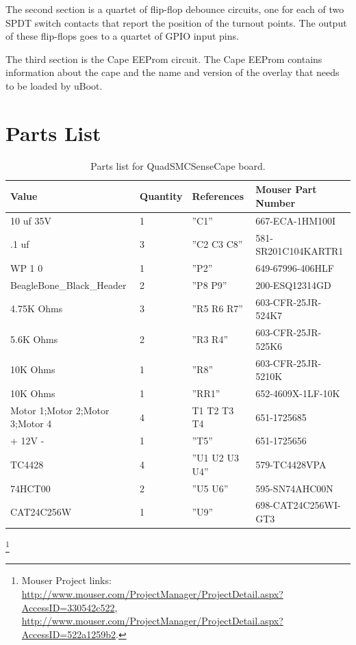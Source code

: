 The second section is a quartet of flip-flop debounce circuits, one for each
of two SPDT switch contacts that report the position of the turnout points.
The output of these flip-flops goes to a quartet of GPIO input pins.

The third section is the Cape EEProm circuit.  The Cape EEProm contains 
information about the cape and the name and version of the overlay that needs 
to be loaded by uBoot.

\section{Parts List}

\begin{table}[htp]
\begin{centering}\begin{tabular}{|l|l|p{1in}|l|}
\hline
Value&Quantity&References&Mouser Part Number \\
\hline
10 uf 35V&1&''C1''&667-ECA-1HM100I \\
\hline
.1 uf&3&''C2 C3 C8''&581-SR201C104KARTR1 \\
\hline
WP 1 0&1&''P2''&649-67996-406HLF \\
\hline
BeagleBone\_Black\_Header&2&''P8 P9''&200-ESQ12314GD \\
\hline
4.75K Ohms&3&''R5 R6 R7''&603-CFR-25JR-524K7 \\
\hline 
5.6K Ohms&2&''R3 R4''&603-CFR-25JR-525K6 \\
\hline
10K Ohms&1&''R8''&603-CFR-25JR-5210K \\
\hline
10K Ohms&1&''RR1''&652-4609X-1LF-10K \\
\hline
Motor 1;Motor 2;Motor 3;Motor 4&4&T1 T2 T3 T4&651-1725685 \\
\hline
+ 12V -&1&''T5''&651-1725656 \\
\hline
TC4428&4&''U1 U2 U3 U4''&579-TC4428VPA \\
\hline
74HCT00&2&''U5 U6''&595-SN74AHC00N \\
\hline
CAT24C256W&1&''U9''&698-CAT24C256WI-GT3 \\
\hline
\end{tabular}
\caption{Parts list for QuadSMCSenseCape board.}
\end{centering}\end{table}\footnote{Mouser Project links: 
\url{http://www.mouser.com/ProjectManager/ProjectDetail.aspx?AccessID=330542c522},
\url{http://www.mouser.com/ProjectManager/ProjectDetail.aspx?AccessID=522a1259b2}.}


